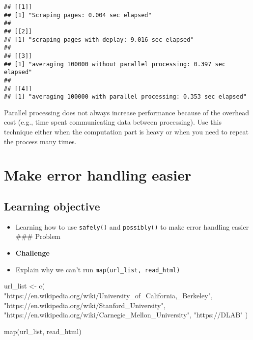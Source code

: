 \documentclass[
]{book}
\newenvironment{Shaded}{\begin{snugshade}}{\end{snugshade}}
\newcommand{\FunctionTok}[1]{\textcolor[rgb]{0.00,0.00,0.00}{#1}}
\newcommand{\NormalTok}[1]{#1}
\newcommand{\OtherTok}[1]{\textcolor[rgb]{0.56,0.35,0.01}{#1}}
\newcommand{\StringTok}[1]{\textcolor[rgb]{0.31,0.60,0.02}{#1}}
\begin{document}
\begin{verbatim}
## [[1]]
## [1] "Scraping pages: 0.004 sec elapsed"
## 
## [[2]]
## [1] "scraping pages with deplay: 9.016 sec elapsed"
## 
## [[3]]
## [1] "averaging 100000 without parallel processing: 0.397 sec elapsed"
## 
## [[4]]
## [1] "averaging 100000 with parallel processing: 0.353 sec elapsed"
\end{verbatim}

Parallel processing does not always increase performance because of the overhead cost (e.g., time spent communicating data between processing). Use this technique either when the computation part is heavy or when you need to repeat the process many times.

\hypertarget{robustness}{%
\section{Make error handling easier}\label{robustness}}

\hypertarget{learning-objective}{%
\subsection{Learning objective}\label{learning-objective}}

\begin{itemize}
\item
  Learning how to use \texttt{safely()} and \texttt{possibly()} to make error handling easier
  \#\#\# Problem
\item
  \textbf{Challenge}
\item
  Explain why we can't run \texttt{map(url\_list,\ read\_html)}
\end{itemize}

\begin{Shaded}
\begin{Highlighting}[]
\NormalTok{url\_list }\OtherTok{\textless{}{-}} \FunctionTok{c}\NormalTok{(}
  \StringTok{"https://en.wikipedia.org/wiki/University\_of\_California,\_Berkeley"}\NormalTok{,}
  \StringTok{"https://en.wikipedia.org/wiki/Stanford\_University"}\NormalTok{,}
  \StringTok{"https://en.wikipedia.org/wiki/Carnegie\_Mellon\_University"}\NormalTok{,}
  \StringTok{"https://DLAB"}
\NormalTok{)}
\end{Highlighting}
\end{Shaded}

\begin{Shaded}
\begin{Highlighting}[]
\FunctionTok{map}\NormalTok{(url\_list, read\_html)}
\end{Highlighting}
\end{Shaded}
\end{document}
